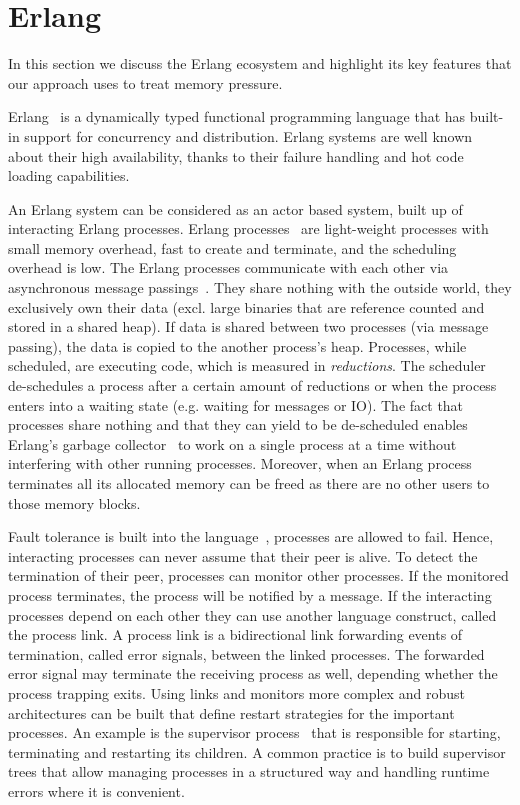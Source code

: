 \documentclass{llncs}
\begin{document}
\section{Erlang}
\label{sec:erlang}
In this section we discuss the Erlang ecosystem and highlight its key features that our approach uses to treat memory pressure. 

Erlang~\cite{erlang} is a dynamically typed functional programming language that has built-in support for concurrency and distribution. Erlang systems are well known about their high availability, thanks to their failure handling and hot code loading capabilities.

An Erlang system can be considered as an actor based system, built up of interacting Erlang processes. Erlang processes~\cite{processes} are light-weight processes with small memory overhead, fast to create and terminate, and the scheduling overhead is low. The Erlang processes communicate with each other via asynchronous message passings~\cite{message-passing}. They share nothing with the outside world, they exclusively own their data (excl. large binaries that are reference counted and stored in a shared heap). If data is shared between two processes (via message passing), the data is copied to the another process's heap. Processes, while scheduled, are executing code, which is measured in \emph{reductions}. The scheduler~\cite{scheduler} de-schedules a process after a certain amount of reductions or when the process enters into a waiting state (e.g. waiting for messages or IO). The fact that processes share nothing and that they can yield to be de-scheduled enables Erlang's garbage collector~\cite{garbage-collector} to work on a single process at a time without interfering with other running processes. Moreover, when an Erlang process terminates all its allocated memory can be freed as there are no other users to those memory blocks. 

Fault tolerance is built into the language~\cite{fault-tolerance}, processes are allowed to fail. Hence, interacting processes can never assume that their peer is alive. To detect the termination of their peer, processes can monitor other processes. If the monitored process terminates, the process will be notified by a message. If the interacting processes depend on each other they can use another language construct, called the process link. A process link is a bidirectional link forwarding  events of termination, called error signals, between the linked processes. The forwarded error signal may terminate the receiving process as well, depending whether the process trapping exits. Using links and monitors more complex and robust architectures can be built that define restart strategies for the important processes. An example is the supervisor process~\cite{supervisor} that is responsible for starting, terminating and restarting its children. A common practice is to build supervisor trees that allow managing processes in a structured way and handling runtime errors where it is convenient. 
\end{document}
